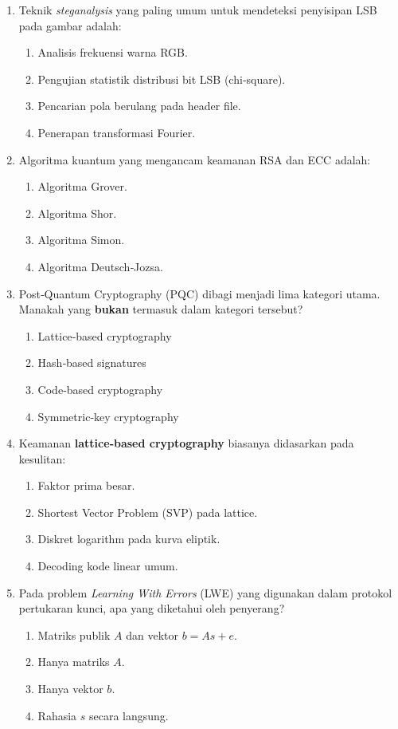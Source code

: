 \documentclass[12pt]{article}
\begin{document}
\begin{enumerate}[label=\textbf{Soal \arabic*.}, leftmargin=*, itemsep=1.5em]
\item Teknik \textit{steganalysis} yang paling umum untuk mendeteksi penyisipan LSB pada gambar adalah:
\begin{enumerate}[label=\Alph*.]
    \item Analisis frekuensi warna RGB.
    \item Pengujian statistik distribusi bit LSB (chi‑square).
    \item Pencarian pola berulang pada header file.
    \item Penerapan transformasi Fourier.
\end{enumerate}

\item Algoritma kuantum yang mengancam keamanan RSA dan ECC adalah:
\begin{enumerate}[label=\Alph*.]
    \item Algoritma Grover.
    \item Algoritma Shor.
    \item Algoritma Simon.
    \item Algoritma Deutsch‑Jozsa.
\end{enumerate}

\item Post‑Quantum Cryptography (PQC) dibagi menjadi lima kategori utama. Manakah yang \textbf{bukan} termasuk dalam kategori tersebut?
\begin{enumerate}[label=\Alph*.]
    \item Lattice‑based cryptography
    \item Hash‑based signatures
    \item Code‑based cryptography
    \item Symmetric‑key cryptography
\end{enumerate}

\item Keamanan \textbf{lattice‑based cryptography} biasanya didasarkan pada kesulitan:
\begin{enumerate}[label=\Alph*.]
    \item Faktor prima besar.
    \item Shortest Vector Problem (SVP) pada lattice.
    \item Diskret logarithm pada kurva eliptik.
    \item Decoding kode linear umum.
\end{enumerate}

\item Pada problem \textit{Learning With Errors} (LWE) yang digunakan dalam protokol pertukaran kunci, apa yang diketahui oleh penyerang?
\begin{enumerate}[label=\Alph*.]
    \item Matriks publik $A$ dan vektor $b = A s + e$.
    \item Hanya matriks $A$.
    \item Hanya vektor $b$.
    \item Rahasia $s$ secara langsung.
\end{enumerate}


\end{enumerate}
\end{document}
